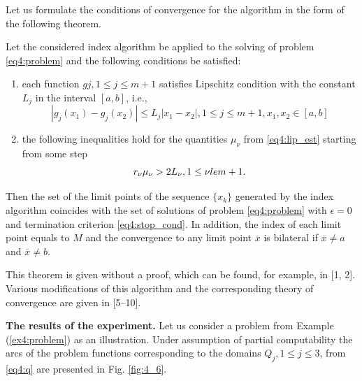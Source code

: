 \documentclass[graybox]{svmult}
\begin{document}
Let us formulate the conditions of convergence for the algorithm in the form of the following theorem.
\begin{theorem}
Let the considered index algorithm be applied to the solving of problem \eqref{eq4:problem} and the following conditions be satisfied:
\begin{enumerate}
  \item each function $gj, 1\le j\le m+1$ satisfies Lipschitz condition with the constant $L_j$ in the interval $[a,b]$, i.e.,
  \[
  |g_j(x_1)-g_j(x_2)|\le L_j|x_1-x_2|,1\le j\le m+1,x_1,x_2 \in[a,b]
  \]
  \item the following inequalities hold for the quantities $\mu_\nu$ from \eqref{eq4:lip_est} starting from some step
  \[
  r_\nu\mu_\nu > 2L_\nu,1\le\nu\\le m+1.
  \]
\end{enumerate}

Then the set of the limit points of the sequence $\{x_k\}$ generated by the index algorithm coincides with the set of solutions of problem \eqref{eq4:problem} with $\epsilon=0$ and termination criterion \eqref{eq4:stop_cond}. In addition, the index of each limit point equals to $M$ and the convergence to any limit point $\overline{x}$  is bilateral if $\overline{x}\not=a$ and $\overline{x}\not=b$.
\end{theorem}

This theorem is given without a proof, which can be found, for example, in \cite{}[1, 2]. Various modifications of this algorithm and the corresponding theory of convergence are given in \cite{}[5–10].

\textbf{The results of the experiment.} Let us consider a problem from Example (\ref{ex4:problem}) as an illustration. Under assumption of partial computability the arcs of the problem functions corresponding to the domains $Q_j, 1\le j\le 3$, from \eqref{eq4:q} are presented in Fig. \ref{fig:4_6}.
\end{document}
